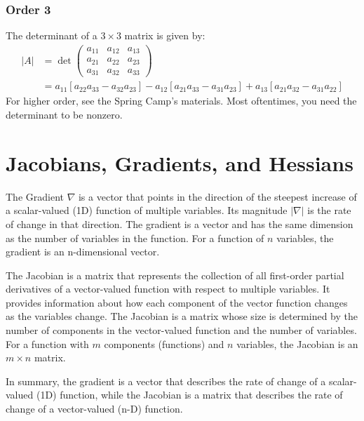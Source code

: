 \documentclass[11pt,a4paper]{book}
\theoremstyle{definition}\newtheorem{definition}{Definition}
\theoremstyle{definition}\newtheorem{fact}{Fact}
\theoremstyle{definition}\newtheorem{remark}{Remark}
\theoremstyle{definition}\newtheorem{ex}{Ex.}
\theoremstyle{definition}\newtheorem{project}{Project}
\theoremstyle{definition}\newtheorem{problem}{Problem}
\theoremstyle{definition}\newtheorem{example}{Example}
\numberwithin{theorem}{section}
\numberwithin{corollary}{chapter}
\numberwithin{assumption}{chapter}
\numberwithin{definition}{chapter}
\numberwithin{prop}{chapter}
\numberwithin{notation}{chapter}
\numberwithin{problem}{chapter}
\numberwithin{example}{chapter}
\numberwithin{fact}{chapter}
\numberwithin{ex}{chapter}
\begin{document}
\begin{appendices}
	\subsubsection*{Order 3}
	The determinant of a $3\times 3$ matrix is given by:
	\begin{align*}
		|A| &= \det \begin{pmatrix}
			a_{11} & a_{12} & a_{13} \\
			a_{21} & a_{22} & a_{23} \\
			a_{31} & a_{32} & a_{33} 
		\end{pmatrix} \\
		&= a_{11} [a_{22}a_{33} - a_{32}a_{23}] 
		- a_{12}[a_{21}a_{33} - a_{31}a_{23}] 
		+ a_{13}[a_{21}a_{32} - a_{31}a_{22}]
	\end{align*}
	For higher order, see the Spring Camp's materials. Most oftentimes, you need the determinant to be nonzero.
	
	\section{Jacobians, Gradients, and Hessians}
	The Gradient $\nabla$ is a vector that points in the direction of the steepest increase of a scalar-valued (1D) function of multiple variables. Its magnitude $|\nabla |$ is the rate of change in that direction. The gradient is a vector and has the same dimension as the number of variables in the function. For a function of $n$ variables, the gradient is an n-dimensional vector.
	
	The Jacobian is a matrix that represents the collection of all first-order partial derivatives of a vector-valued function with respect to multiple variables. It provides information about how each component of the vector function changes as the variables change. The Jacobian is a matrix whose size is determined by the number of components in the vector-valued function and the number of variables. For a function with $m$ components (functions) and $n$ variables, the Jacobian is an $m \times n$ matrix.
	
	In summary, the gradient is a vector that describes the rate of change of a scalar-valued (1D) function, while the Jacobian is a matrix that describes the rate of change of a vector-valued (n-D) function.
	

\end{appendices}
\end{document}
